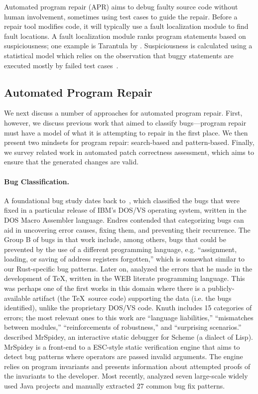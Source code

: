 Automated program repair (APR) aims to debug faulty source code without human involvement, sometimes using test cases to guide the repair. Before a repair tool modifies code, it will typically use a fault localization module to find fault locations. A fault localization module ranks program statements based on suspiciousness; one example is Tarantula by \cite{jones2005empirical}. Suspiciousness is calculated using a statistical model which relies on the observation that buggy statements are executed mostly by failed test cases~\citep{naish2009spectral,xie2013theoretical}.

\subsection{Automated Program Repair}
We next discuss a number of approaches for automated program repair. First, however, we discuss previous work that aimed to classify bugs---program repair must have a model of what it is attempting to repair in the first place. We then present two mindsets for program repair: search-based and pattern-based. Finally, we survey related work in automated patch correctness assessment, which aims to ensure that the generated changes are valid.

\paragraph{Bug Classification.}
A foundational bug study dates back to~\cite{endres1975analysis}, which classified the bugs that were fixed in a particular release of IBM's DOS/VS operating system, written in the DOS Macro Assembler language. Endres contended that categorizing bugs can aid in uncovering error causes, fixing them, and preventing their recurrence. The Group B of bugs in that work include, among others, bugs that could be prevented by the use of a different programming language, e.g. ``assignment, loading, or saving of address registers forgotten,'' which is somewhat similar to our Rust-specific bug patterns. Later on, \cite{knuth89:_error_tex} analyzed the errors that he made in the development of \TeX, written in the WEB literate programming language. This was perhaps one of the first works in this domain where there is a publicly-available artifact (the \TeX~source code) supporting the data (i.e. the bugs identified), unlike the proprietary DOS/VS code. Knuth includes 15 categories of errors; the most relevant ones to this work are ``language liabilities,'' ``mismatches between modules,'' ``reinforcements of robustness,'' and ``surprising scenarios.'' \cite{flanagan1998new} described MrSpidey, an interactive static debugger for Scheme (a dialect of Lisp). MrSpidey is a front-end to a ESC-style static verification engine that aims to detect bug patterns where operators are passed invalid arguments. The engine relies on program invariants and presents information about attempted proofs of the invariants to the developer. Most recently, \cite{pan2009toward} analyzed seven large-scale widely used Java projects and manually extracted 27 common bug fix patterns.

